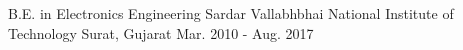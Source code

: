 

\begin{cventries}

  \cventry
    {B.E. in Electronics Engineering} %
    {Sardar Vallabhbhai National Institute of Technology} %
    {Surat, Gujarat} %
    {Mar. 2010 - Aug. 2017} %
    {
      \begin{cvitems} %
      \end{cvitems}
    }

\end{cventries}
